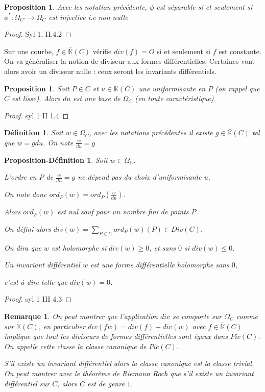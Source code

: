 \documentclass{article}
\newcommand{\K}[0]{\mathbb{K}}
\newcommand{\Kb}[0]{\bar{\K}}
\newtheorem{Prop}[The]{Proposition}
\newtheorem{Prod}[The]{Proposition-Définition}
\newtheorem{Def}[The]{Définition}
\newtheorem{Rem}[The]{Remarque}
\begin{document}
\begin{Prop}
	Avec les notation précédente, $\phi$ est séparable si et seulement si $\phi^{*} : \Omega_{C'} \rightarrow \Omega_{C}$ est injective i.e non nulle
\end{Prop}

\begin{proof}
	Syl 1, II.4.2
\end{proof}

Sur une courbe, $f\in\Kb(C)$ vérifie $div(f) = O$ si et seulement si $f$ est constante. On va généraliser la notion de diviseur aux formes différentielles. Certaines vont alors avoir un diviseur nulle : ceux seront les invariants différentiels. 

\begin{Prop}
	Soit $P\in C$ et $u\in \Kb(C)$ une uniformisante en $P$ (on rappel que $C$ est lisse). Alors $du$ est une base de $\Omega_{C}$ (en toute caractéristique) 
\end{Prop}

\begin{proof}
	syl 1 II 1.4
\end{proof}

\begin{Def}
	Soit $w\in\Omega_{C}$, avec les notations précédentes il existe $g\in\Kb(C)$ tel que $w = gdu$. On note $\frac{w}{du} = g$
\end{Def}

\begin{Prod}
	Soit $w\in\Omega_{C}$. 
	
	L'ordre en $P$ de $\frac{w}{du} = g$ ne dépend pas du choix d'uniformisante $u$. 
	
	On note donc $ord_{P}(w) = ord_{P}(\frac{w}{du})$. 
	
	Alors $ord_{P}(w)$ est nul sauf pour un nombre fini de points $P$.
	
	On défini alors $div(w) = \sum_{P\in C} ord_{P}(w)(P) \in Div(C)$.
	
	On dira que $w$ est holomorphe si $div(w)\geq 0$, et sans $0$ si $div(w)\leq 0$.
	
	Un invariant différentiel $w$ est une forme différentielle holomorphe sans $0$, 
	
	c'est à dire telle que $div(w) = 0$.
\end{Prod}

\begin{proof}
	syl 1 III 4.3
\end{proof}

\begin{Rem}
	On peut montrer que l'application $div$ se comporte sur $\Omega_{C}$ comme sur $\Kb(C)$, en particulier $div(fw) = div(f) + div(w)$ avec $f\in\Kb(C)$ implique que tout les diviseurs de formes différentielles sont égaux dans $Pic(C)$. On appelle cette classe la classe canonique de $Pic(C)$. 
	
	S'il existe un invariant différentiel alors la classe canonique est la classe trivial. On peut montrer avec le théorème de Riemann Roch que s'il existe un invariant différentiel sur $C$, alors $C$ est de genre $1$.
\end{Rem}
\end{document}
